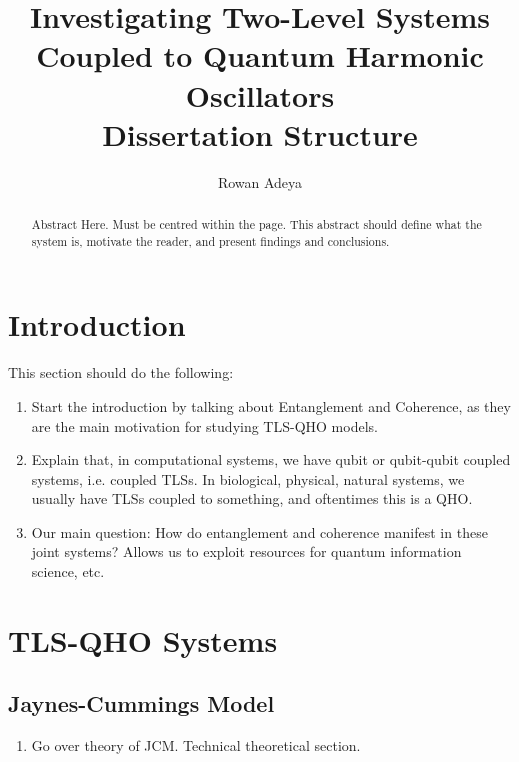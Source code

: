 \documentclass{article}
\title{\textbf{Investigating Two-Level Systems Coupled to Quantum Harmonic Oscillators} \\ Dissertation Structure}
\author{Rowan Adeya}
\date{}
\begin{document}
\maketitle

\newpage

\vspace{\fill}
\begin{abstract}
    Abstract Here. Must be centred within the page. This abstract should define what the system is, motivate the reader, and present findings and conclusions.
\end{abstract}
\vspace{\fill}

\newpage

\tableofcontents

\newpage
\section{Introduction}
This section should do the following:
\begin{enumerate}
    \item Start the introduction by talking about Entanglement and Coherence, as they are the main motivation for studying TLS-QHO models.
    \item  Explain that, in computational systems, we have qubit or qubit-qubit coupled systems, i.e. coupled TLSs. In biological, physical, natural systems, we usually have TLSs coupled to something, and oftentimes this is a QHO.
    \item  Our main question: How do entanglement and coherence manifest in these joint systems? Allows us to exploit resources for quantum information science, etc.
\end{enumerate}
\newpage
\section{TLS-QHO Systems}
\subsection{Jaynes-Cummings Model}
\begin{enumerate}
    \item Go over theory of JCM. Technical theoretical section.
\end{enumerate}
\end{document}
